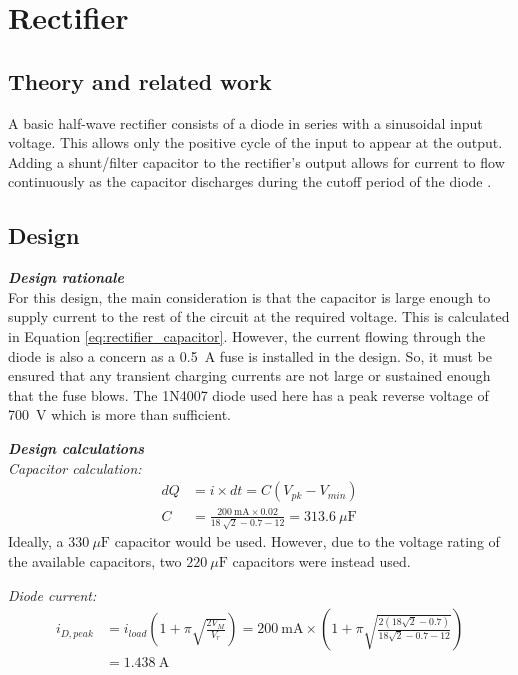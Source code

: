 \chapter{Rectifier}
\section{Theory and related work} \label{sec:literature_rectifier}
A basic half-wave rectifier consists of a diode in series with a sinusoidal input voltage. This allows only the positive cycle of the input to appear at the output. Adding a shunt/filter capacitor to the rectifier's output allows for current to flow continuously as the capacitor discharges during the cutoff period of the diode \cite{Neamen:Microelectronics}.


\section{Design} \label{sec:design_rectifier}

\textbf{\textit{Design rationale}} \\
For this design, the main consideration is that the capacitor is large enough to supply current to the rest of the circuit at the required voltage. This is calculated in Equation \ref{eq:rectifier_capacitor}. However, the current flowing through the diode is also a concern as a \SI{0.5}{\ampere} fuse is installed in the design. So, it must be ensured that any transient charging currents are not large or sustained enough that the fuse blows. The 1N4007 diode used here has a peak reverse voltage of \SI{700}{\volt}\cite{1N4007} which is more than sufficient.


\noindent\textbf{\textit{Design calculations}} \\
\textit{Capacitor calculation:}
\begin{equation}\label{eq:rectifier_capacitor}
\begin{split}
        dQ &= i \times dt = C(V_{pk} - V_{min}) \\ 
        C &= \frac{\SI{200}{\milli\ampere} \times 0.02}{\SI{18}{\sqrt{2}}-0.7-12} = \SI{313.6}{\mu\farad}
\end{split}
\end{equation}
Ideally, a $\SI{330}{\mu\farad}$ capacitor would be used. However, due to the voltage rating of the available capacitors, two $\SI{220}{\mu\farad}$ capacitors were instead used.

\textit{Diode current\cite{Neamen:Microelectronics}:}
\begin{equation}
\begin{split}
    i_{D,peak} &= i_{load}(1 + \pi\sqrt{\frac{2V_M}{V_r}})
    = \SI{200}{\milli\ampere} \times (1 + \pi\sqrt{\frac{2(18\sqrt{2}-0.7)}{18\sqrt{2}-0.7-12}}) \\
    &= \SI{1.438}{\ampere}
\end{split}
\end{equation}

